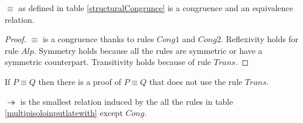 \begin{proposition}
  $\equiv$ as defined in table \ref{structuralCongrunce} is a congruence and an equivalence relation.
  \begin{proof}
    $\equiv$ is a congruence thanks to rules $Cong1$ and $Cong2$. Reflexivity holds for rule $Alp$. Symmetry holds because all the rules are symmetric or have a symmetric counterpart. Transitivity holds because of rule $Trans$.
  \end{proof}
\end{proposition}

\begin{lemma}
  If $P \equiv Q$ then there is a proof of $P \equiv Q$ that does not use the rule $Trans$.
\end{lemma}

\begin{definition}
  $\twoheadrightarrow$ is the smallest relation induced by the all the rules in table \ref{multipisoloinputlatewith} except $Cong$. 
\end{definition}

